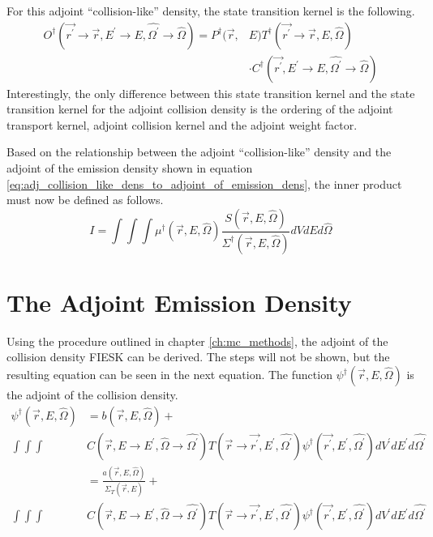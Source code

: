 For this adjoint ``collision-like'' density, the state transition kernel is the 
following. 
\begin{equation}
  \begin{split}
    O^{\dagger}(\vec{r^{'}} \to \vec{r},E^{'} \to E,\hat{\Omega^{'}} \to \hat{\Omega})
    = P^{\dagger}(\vec{r},&E) 
    T^{\dagger}(\vec{r^{'}} \to \vec{r},E,\hat{\Omega}) \\
    & \cdot C^{\dagger}(\vec{r^{'}},E^{'} \to E,\hat{\Omega^{'}} \to \hat{\Omega})
  \end{split}
\end{equation}
Interestingly, the only difference between this state transition
kernel and the state transition kernel for the adjoint collision density is
the ordering of the adjoint transport kernel, adjoint collision kernel and the
adjoint weight factor.

Based on the relationship between the adjoint ``collision-like'' density and the
adjoint of the emission density shown in equation 
\ref{eq:adj_collision_like_dens_to_adjoint_of_emission_dens}, the inner product
must now be defined as follows.
\begin{equation}
  I = \int\int\int \mu^{\dagger}(\vec{r},E,\hat{\Omega})
  \frac{S(\vec{r},E,\hat{\Omega})}{\Sigma^{\dagger}(\vec{r},E,\hat{\Omega})}
  dV dE d\hat{\Omega}
\end{equation}

\section{The Adjoint Emission Density}
Using the procedure outlined in chapter \ref{ch:mc_methods}, the adjoint of the
collision density FIESK can be derived. The steps will not be shown, but the 
resulting equation can be seen in the next equation. The function 
$\psi^{\dagger}(\vec{r},E,\hat{\Omega})$ is the adjoint of the collision density.
\begin{align}
  \psi^{\dagger}(\vec{r},E,\hat{\Omega}) & = b(\vec{r},E,\hat{\Omega}) + 
  \nonumber \\
  \int\int\int &C(\vec{r},E \to E^{'},\hat{\Omega} \to \hat{\Omega^{'}})
  T(\vec{r} \to \vec{r^{'}},E^{'},\hat{\Omega^{'}})
  \psi^{\dagger}(\vec{r^{'}},E^{'},\hat{\Omega^{'}}) dV^{'}dE^{'}d\hat{\Omega^{'}}
  \nonumber \\
   & = \frac{a(\vec{r},E,\hat{\Omega})}
            {\Sigma_T(\vec{r},E)}+ \nonumber \\
   \int\int\int & C(\vec{r},E \to E^{'},\hat{\Omega} \to \hat{\Omega^{'}})
   T(\vec{r} \to \vec{r^{'}},E^{'},\hat{\Omega^{'}})
   \psi^{\dagger}(\vec{r^{'}},E^{'},\hat{\Omega^{'}}) dV^{'}dE^{'}d\hat{\Omega^{'}}
   \nonumber
\end{align}

